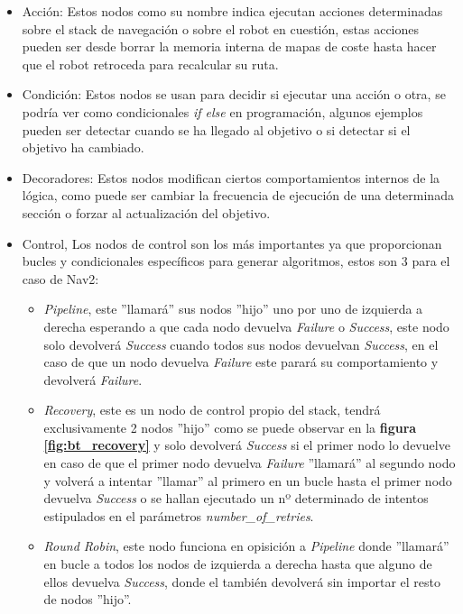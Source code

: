 \begin{itemize}
    \item Acción: Estos nodos como su nombre indica ejecutan acciones determinadas sobre el stack de navegación o sobre el robot en cuestión, estas acciones pueden ser desde borrar la memoria interna de mapas de coste hasta hacer que el robot retroceda para recalcular su ruta.
    \item Condición: Estos nodos se usan para decidir si ejecutar una acción o otra, se podría ver como condicionales \textit{if{} else{}} en programación, algunos ejemplos pueden ser detectar cuando se ha llegado al objetivo o si detectar si el objetivo ha cambiado.
    \item Decoradores: Estos nodos modifican ciertos comportamientos internos de la lógica, como puede ser cambiar la frecuencia de ejecución de una determinada sección o forzar al actualización del objetivo.
    \item Control, Los nodos de control son los más importantes ya que proporcionan bucles y condicionales específicos para generar algoritmos, estos son 3 para el caso de Nav2:
    \begin{itemize}
        \item \textit{Pipeline}, este ''llamará'' sus nodos ''hijo'' uno por uno de izquierda a derecha esperando a que cada nodo devuelva \textit{Failure} o \textit{Success}, este nodo solo devolverá \textit{Success} cuando todos sus nodos devuelvan \textit{Success}, en el caso de que un nodo devuelva \textit{Failure} este parará su comportamiento y devolverá \textit{Failure}.
        \item \textit{Recovery}, este es un nodo de control propio del stack, tendrá exclusivamente 2 nodos ''hijo'' como se puede observar en la \textbf{figura \ref{fig:bt_recovery}} y solo devolverá \textit{Success} si el primer nodo lo devuelve en caso de que el primer nodo devuelva \textit{Failure} ''llamará'' al segundo nodo y volverá a intentar ''llamar'' al primero en un bucle hasta el primer nodo devuelva \textit{Success} o se hallan ejecutado un nº determinado de intentos estipulados en el parámetros \textit{number\_of\_retries}.
        \item \textit{Round Robin}, este nodo funciona en opisición a \textit{Pipeline} donde ''llamará'' en bucle a todos los nodos de izquierda a derecha hasta que alguno de ellos devuelva \textit{Success}, donde el también devolverá  sin importar el resto de nodos ''hijo''.
    \end{itemize}
\end{itemize}

